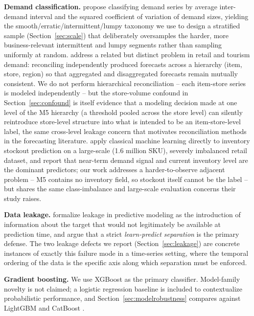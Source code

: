\documentclass[11pt]{article}
\begin{document}
\textbf{Demand classification.} \citet{syntetos2005categorization} propose classifying demand series by average inter-demand interval and the squared coefficient of variation of demand sizes, yielding the smooth/erratic/intermittent/lumpy taxonomy we use to design a stratified sample (Section~\ref{sec:scale}) that deliberately oversamples the harder, more business-relevant intermittent and lumpy segments rather than sampling uniformly at random. \citet{hyndman2011optimal} address a related but distinct problem in retail and tourism demand: reconciling independently produced forecasts across a hierarchy (item, store, region) so that aggregated and disaggregated forecasts remain mutually consistent. We do not perform hierarchical reconciliation -- each item-store series is modeled independently -- but the store-volume confound in Section~\ref{sec:confound} is itself evidence that a modeling decision made at one level of the M5 hierarchy (a threshold pooled across the store level) can silently reintroduce store-level structure into what is intended to be an item-store-level label, the same cross-level leakage concern that motivates reconciliation methods in the forecasting literature. \citet{liu2025machine} apply classical machine learning directly to inventory stockout prediction on a large-scale (1.6 million SKU), severely imbalanced retail dataset, and report that near-term demand signal and current inventory level are the dominant predictors; our work addresses a harder-to-observe adjacent problem -- M5 contains no inventory field, so stockout itself cannot be the label -- but shares the same class-imbalance and large-scale evaluation concerns their study raises.

\textbf{Data leakage.} \citet{kaufman2012leakage} formalize leakage in predictive modeling as the introduction of information about the target that would not legitimately be available at prediction time, and argue that a strict \emph{learn-predict separation} is the primary defense. The two leakage defects we report (Section~\ref{sec:leakage}) are concrete instances of exactly this failure mode in a time-series setting, where the temporal ordering of the data is the specific axis along which separation must be enforced.

\textbf{Gradient boosting.} We use XGBoost \citep{chen2016xgboost} as the primary classifier. Model-family novelty is not claimed; a logistic regression baseline is included to contextualize probabilistic performance, and Section~\ref{sec:modelrobustness} compares against LightGBM \citep{ke2017lightgbm} and CatBoost \citep{prokhorenkova2018catboost}.
\end{document}
